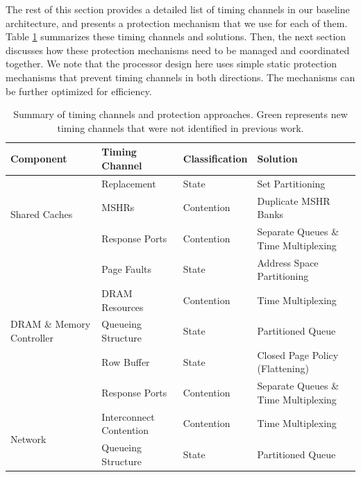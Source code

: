 The rest of this section provides a detailed list of timing channels in our
baseline architecture, and presents a protection mechanism that we use for each of them.
Table \ref{table:timing_chan_summary} summarizes these timing channels and
solutions. 
Then, the next section discusses how these protection mechanisms
need to be managed and coordinated together.
We note that the processor design here uses simple static protection
mechanisms that prevent timing channels in both directions. The mechanisms 
can be further optimized for efficiency.

\def\novelcolor{Green}
\begin{table}
\begin{tabular}{l|l|l|l}
    \hline
    Component & Timing Channel & Classification & Solution\\
    \hline
    \multirow{3}{*}{Shared Caches}
    & Replacement & State  & Set Partitioning \\
    \hhline{~---}
    & {\color{\novelcolor}MSHRs}
    & {\color{\novelcolor}Contention }
    & {\color{\novelcolor}Duplicate MSHR Banks} \\
    \hhline{~---}
    & {\color{\novelcolor}Response Ports}
    & {\color{\novelcolor}Contention }
    & {\color{\novelcolor}Separate Queues \& Time Multiplexing}\\
    \hline
    \multirow{5}{*}{DRAM \& Memory Controller}
    & Page Faults & State  & Address Space Partitioning \\
    \hhline{~---}
    & DRAM Resources & Contention  & Time Multiplexing \\
    \hhline{~---}
    & Queueing Structure & State  & Partitioned Queue \\
    \hhline{~---}
    & Row Buffer & State & Closed Page Policy (Flattening)\\
    \hhline{~---}
    & {\color{\novelcolor} Response Ports} 
    & {\color{\novelcolor} Contention }
    & {\color{\novelcolor} Separate Queues \& Time Multiplexing}\\
    \hline
    \multirow{2}{*}{Network} 
    & Interconnect Contention & Contention & Time Multiplexing \\
    \hhline{~---}
    & Queueing Structure & State & Partitioned Queue \\
\end{tabular}
    \caption{Summary of timing channels and protection approaches. Green represents new timing channels that were not identified in previous work.}
    \label{table:timing_chan_summary}
\end{table}

